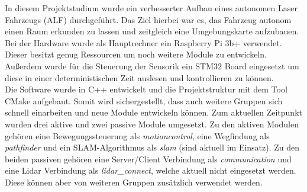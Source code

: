 
\vspace{15.0mm}




In diesem Projektstudium wurde ein verbesserter Aufbau eines autonomen Laser Fahrzeugs (ALF) durchgeführt. Das Ziel hierbei war es, das Fahrzeug autonom einen Raum erkunden zu lassen und zeitgleich eine Umgebungskarte aufzubauen.\\
Bei der Hardware wurde als Hauptrechner ein Raspberry Pi 3b+ verwendet. Dieser besitzt genug Ressourcen um noch weitere Module zu entwickeln. Außerdem wurde für die Steuerung der Sensorik ein STM32 Board eingesetzt um diese in einer deterministischen Zeit auslesen und kontrollieren zu können.\\
Die Software wurde in C++ entwickelt und die Projektstruktur mit dem Tool CMake aufgebaut. Somit wird sichergestellt, dass auch weitere Gruppen sich schnell einarbeiten und neue Module entwickeln können. Zum aktuellen Zeitpunkt wurden drei aktive und zwei passive Module umgesetzt. Zu den aktiven Modulen gehören eine Bewegungssteuerung als \textit{motioncontrol}, eine Wegfindung als \textit{pathfinder} und ein SLAM-Algorithmus als \textit{slam} (sind aktuell im Einsatz). Zu den beiden passiven gehören eine Server/Client Verbindung als \textit{communication} und eine Lidar Verbindung als \textit{lidar\_connect}, welche aktuell nicht eingesetzt werden. Diese können aber von weiteren Gruppen zusätzlich verwendet werden.  
